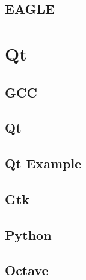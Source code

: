 \documentclass[11pt,fleqn]{book} %
\begin{document}
\section{EAGLE}

\newpage
{} %
\chapter{Qt}
\section{GCC}
\section{Qt}
\section{Qt Example}
\section{Gtk}
\section{Python}
\section{Octave}
\end{document}
